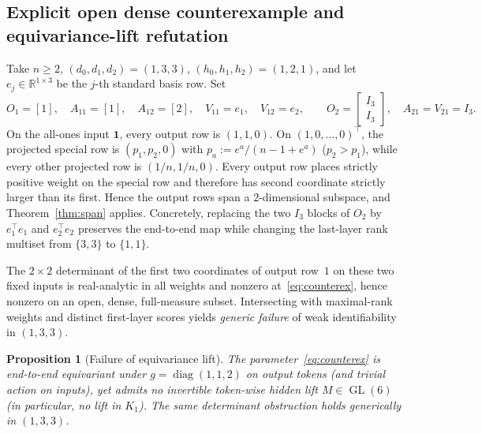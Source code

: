 \documentclass[11pt]{article}
\theoremstyle{plain}
\newtheorem{proposition}[theorem]{Proposition}
\theoremstyle{definition}
\theoremstyle{remark}
\DeclareMathOperator{\GL}{GL}
\DeclareMathOperator{\diag}{diag}
\begin{document}
\subsection{Explicit open dense counterexample and equivariance-lift refutation}

Take $n \ge 2$, $(d_0, d_1, d_2) = (1, 3, 3)$, $(h_0, h_1, h_2) = (1, 2, 1)$, and let $e_j \in \mathbb{R}^{1 \times 3}$ be the $j$-th standard basis row. Set
\begin{equation}\label{eq:counterex}
O_1 = [1], \quad A_{11} = [1], \quad A_{12} = [2], \quad V_{11} = e_1, \quad V_{12} = e_2,
\qquad
O_2 = \begin{bmatrix} I_3 \\ I_3 \end{bmatrix}, \quad A_{21} = V_{21} = I_3.
\end{equation}
On the all-ones input $\mathbf{1}$, every output row is $(1, 1, 0)$. On $(1, 0, \dots, 0)^\top$, the projected special row is $(p_1, p_2, 0)$ with $p_a := e^a / (n - 1 + e^a)$ ($p_2 > p_1$), while every other projected row is $(1/n, 1/n, 0)$. Every output row places strictly positive weight on the special row and therefore has second coordinate strictly larger than its first. Hence the output rows span a $2$-dimensional subspace, and Theorem~\ref{thm:span} applies. Concretely, replacing the two $I_3$ blocks of $O_2$ by $e_1^\top e_1$ and $e_2^\top e_2$ preserves the end-to-end map while changing the last-layer rank multiset from $\{3, 3\}$ to $\{1, 1\}$.

The $2 \times 2$ determinant of the first two coordinates of output row~$1$ on these two fixed inputs is real-analytic in all weights and nonzero at~\eqref{eq:counterex}, hence nonzero on an open, dense, full-measure subset. Intersecting with maximal-rank weights and distinct first-layer scores yields \emph{generic failure} of weak identifiability in $(1, 3, 3)$.

\begin{proposition}[Failure of equivariance lift]\label{prop:lift}
The parameter~\eqref{eq:counterex} is end-to-end equivariant under $g = \diag(1, 1, 2)$ on output tokens (and trivial action on inputs), yet admits no invertible token-wise hidden lift $M \in \GL(6)$ (in particular, no lift in $K_1$). The same determinant obstruction holds generically in $(1, 3, 3)$.
\end{proposition}
\end{document}
